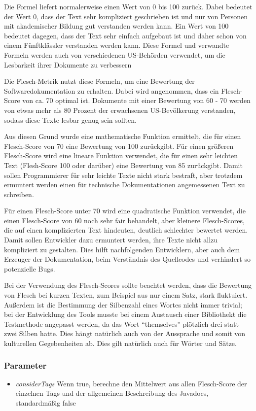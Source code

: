 Die Formel liefert normalerweise einen Wert von 0 bis 100 zurück. Dabei bedeutet der Wert 0, dass der Text sehr kompliziert geschrieben ist und nur von Personen mit akademischer Bildung gut verstanden werden kann. Ein Wert von 100 bedeutet dagegen, dass der Text sehr einfach aufgebaut ist und daher schon von einem Fünftklässler verstanden werden kann. Diese Formel und verwandte Formeln werden auch von verschiedenen US-Behörden verwendet, um die Lesbarkeit ihrer Dokumente zu verbessern\cite[S. 72]{AutomaticQualityAssessmentofSourceCodeComments:TheJavadocMiner}

Die Flesch-Metrik nutzt diese Formeln, um eine Bewertung der Softwaredokumentation zu erhalten. Dabei wird angenommen, dass ein Flesch-Score von ca. 70 optimal ist. Dokumente mit einer Bewertung von 60 - 70 werden von etwas mehr als 80 Prozent der erwachsenen US-Bevölkerung verstanden, sodass diese Texte lesbar genug sein sollten.

Aus diesen Grund wurde eine mathematische Funktion ermittelt, die für einen Flesch-Score von 70 eine Bewertung von 100 zurückgibt. Für einen größeren Flesch-Score wird eine lineare Funktion verwendet, die für einen sehr leichten Text (Flesh-Score 100 oder darüber) eine Bewertung von 85 zurückgibt. Damit sollen Programmierer für sehr leichte Texte nicht stark bestraft, aber trotzdem ermuntert werden einen für technische Dokumentationen angemessenen Text zu schreiben.

Für einen Flesch-Score unter 70 wird eine quadratische Funktion verwendet, die einen Flesch-Score von 60 noch sehr fair behandelt, aber kleinere Flesch-Scores, die auf einen komplizierten Text hindeuten, deutlich schlechter bewertet werden. Damit sollen Entwickler dazu ermuntert werden, ihre Texte nicht allzu kompliziert zu gestalten. Dies hilft nachfolgenden Entwicklern, aber auch dem Erzeuger der Dokumentation, beim Verständnis des Quellcodes und verhindert so potenzielle Bugs.

Bei der Verwendung des Flesch-Scores sollte beachtet werden, dass die Bewertung von Flesch bei kurzen Texten, zum Beispiel aus nur einem Satz, stark fluktuiert. Außerdem ist die Bestimmung der Silbenzahl eines Wortes nicht immer trivial; bei der Entwicklung des Tools musste bei einem Austausch einer Bibliothekt die Testmethode angepasst werden, da das Wort \enquote{themselves} plötzlich drei statt zwei Silben hatte. Dies hängt natürlich auch von der Aussprache und somit von kulturellen Gegebenheiten ab. Dies gilt natürlich auch für Wörter und Sätze. 
\subsubsection{Parameter}
\begin{itemize}
    \item \textit{considerTags} Wenn true, berechne den Mittelwert aus allen Flesch-Score der einzelnen Tags und der allgemeinen Beschreibung des Javadocs, standardmäßig false
\end{itemize}

